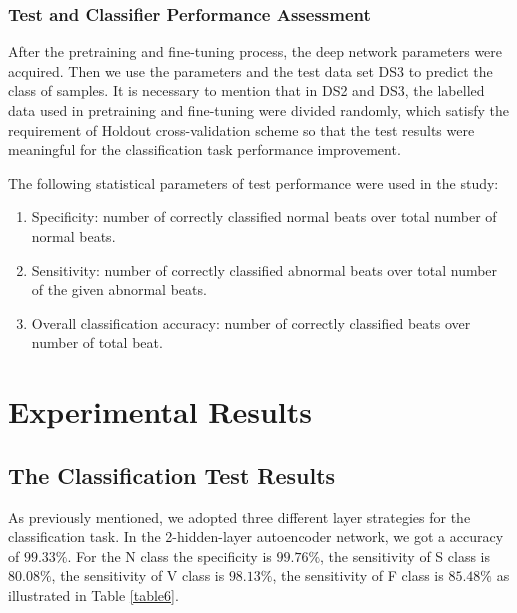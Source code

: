 \documentclass[journal]{IEEEtran}
\begin{document}
\subsubsection{Test and Classifier Performance Assessment}
After the pretraining and fine-tuning process, the deep network parameters were acquired. Then we use the parameters and the test data set DS3 to predict the class of samples. 
It is necessary to mention that in DS2 and DS3, the labelled data used in pretraining and fine-tuning were divided randomly, which satisfy the requirement of Holdout cross-validation scheme so that the test results were meaningful for the classification task performance improvement.

The following statistical parameters of test performance were used in the study:
\begin{enumerate}
\item Specificity: number of correctly classified normal beats over total number of normal beats.
\item Sensitivity: number of correctly classified abnormal beats over total number of the given abnormal beats.
\item Overall classification accuracy: number of correctly classified beats over number of total beat.
\end{enumerate}


\section{Experimental Results}
\subsection{The Classification Test Results}
As previously mentioned, we adopted three different layer strategies for the classification task. 
In the 2-hidden-layer autoencoder network, we got a accuracy of $99.33\%$. For the N class the specificity is $99.76\%$, the sensitivity of S class is $80.08\%$, the sensitivity of V class is $98.13\%$, the sensitivity of F class is $85.48\%$ as illustrated in Table \ref{table6}. 
\end{document}
